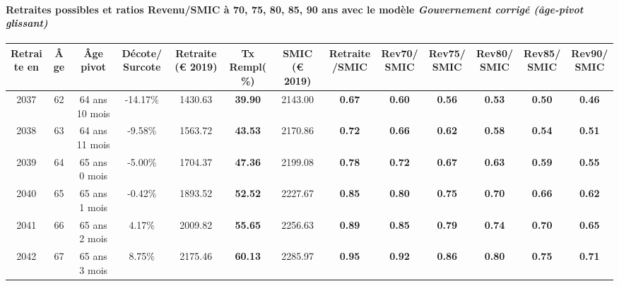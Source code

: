 \paragraph{Retraites possibles et ratios Revenu/SMIC à 70, 75, 80, 85, 90 ans avec le modèle \emph{Gouvernement corrigé (âge-pivot glissant)}}  
 
{ \scriptsize \begin{center} 
\begin{tabular}[htb]{|c|c||c|c||c|c||c||c|c|c|c|c|c|} 
\hline 
 Retraite en &  Âge &  Âge pivot &  Décote/Surcote &  Retraite (\euro{} 2019) &  Tx Rempl(\%) &  SMIC (\euro{} 2019) &  Retraite/SMIC &  Rev70/SMIC &  Rev75/SMIC &  Rev80/SMIC &  Rev85/SMIC &  Rev90/SMIC \\ 
\hline \hline 
 2037 &  62 &  64 ans 10 mois &  -14.17\% &  1430.63 &  {\bf 39.90} &  2143.00 &  {\bf {\color{red} 0.67}} &  {\bf {\color{red} 0.60}} &  {\bf {\color{red} 0.56}} &  {\bf {\color{red} 0.53}} &  {\bf {\color{red} 0.50}} &  {\bf {\color{red} 0.46}} \\ 
\hline 
 2038 &  63 &  64 ans 11 mois &  -9.58\% &  1563.72 &  {\bf 43.53} &  2170.86 &  {\bf {\color{red} 0.72}} &  {\bf {\color{red} 0.66}} &  {\bf {\color{red} 0.62}} &  {\bf {\color{red} 0.58}} &  {\bf {\color{red} 0.54}} &  {\bf {\color{red} 0.51}} \\ 
\hline 
 2039 &  64 &  65 ans 0 mois &  -5.00\% &  1704.37 &  {\bf 47.36} &  2199.08 &  {\bf {\color{red} 0.78}} &  {\bf {\color{red} 0.72}} &  {\bf {\color{red} 0.67}} &  {\bf {\color{red} 0.63}} &  {\bf {\color{red} 0.59}} &  {\bf {\color{red} 0.55}} \\ 
\hline 
 2040 &  65 &  65 ans 1 mois &  -0.42\% &  1893.52 &  {\bf 52.52} &  2227.67 &  {\bf {\color{red} 0.85}} &  {\bf {\color{red} 0.80}} &  {\bf {\color{red} 0.75}} &  {\bf {\color{red} 0.70}} &  {\bf {\color{red} 0.66}} &  {\bf {\color{red} 0.62}} \\ 
\hline 
 2041 &  66 &  65 ans 2 mois &  4.17\% &  2009.82 &  {\bf 55.65} &  2256.63 &  {\bf {\color{red} 0.89}} &  {\bf {\color{red} 0.85}} &  {\bf {\color{red} 0.79}} &  {\bf {\color{red} 0.74}} &  {\bf {\color{red} 0.70}} &  {\bf {\color{red} 0.65}} \\ 
\hline 
 2042 &  67 &  65 ans 3 mois &  8.75\% &  2175.46 &  {\bf 60.13} &  2285.97 &  {\bf {\color{red} 0.95}} &  {\bf {\color{red} 0.92}} &  {\bf {\color{red} 0.86}} &  {\bf {\color{red} 0.80}} &  {\bf {\color{red} 0.75}} &  {\bf {\color{red} 0.71}} \\ 
\hline 
\hline 
\end{tabular} 
\end{center} } 
